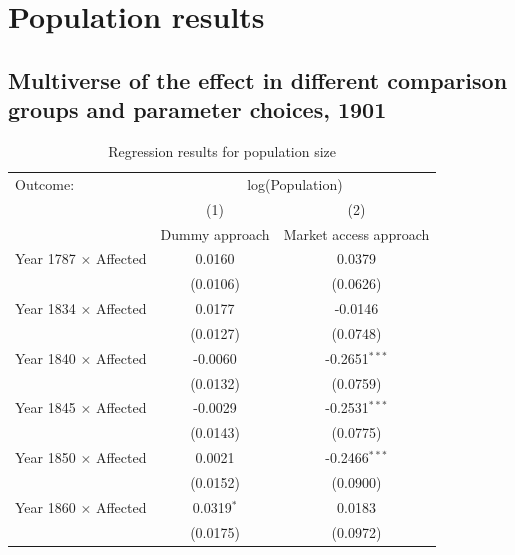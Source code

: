 \FloatBarrier

\section{Population results}

\subsection{Multiverse of the effect in different comparison groups and parameter choices, 1901} 
\FloatBarrier
\begin{table}[H]
\centering
\caption{\label{tab:pop1} Regression results for population size}
\footnotesize
\begin{tabular}{lcc}
   \tabularnewline \midrule \midrule
   Outcome: & \multicolumn{2}{c}{log(Population)}\\
                                                    & (1)             & (2)\\  
                                                    & Dummy approach  & Market access approach\\  
   \midrule
   Year 1787 $\times$ Affected                       & 0.0160          & 0.0379\\   
                                                     & (0.0106)        & (0.0626)\\   
   Year 1834 $\times$ Affected                       & 0.0177          & -0.0146\\   
                                                     & (0.0127)        & (0.0748)\\   
   Year 1840 $\times$ Affected                       & -0.0060         & -0.2651$^{***}$\\   
                                                     & (0.0132)        & (0.0759)\\   
   Year 1845 $\times$ Affected                       & -0.0029         & -0.2531$^{***}$\\   
                                                     & (0.0143)        & (0.0775)\\   
   Year 1850 $\times$ Affected                       & 0.0021          & -0.2466$^{***}$\\   
                                                     & (0.0152)        & (0.0900)\\   
   Year 1860 $\times$ Affected                       & 0.0319$^{*}$    & 0.0183\\   
                                                     & (0.0175)        & (0.0972)\\   

\end{tabular}
\end{table}
